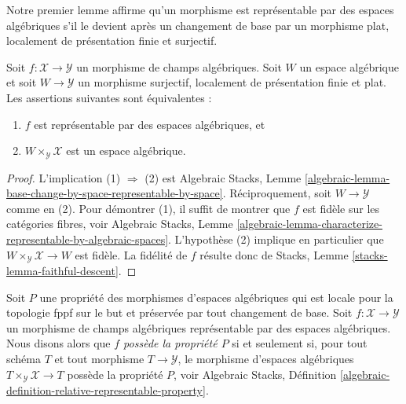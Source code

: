 \medskip\noindent
Notre premier lemme affirme qu'un morphisme est représentable par des espaces algébriques
s'il le devient après un changement de base par un morphisme plat,
localement de présentation finie et surjectif.

\begin{lemma}
\label{lemma-check-representable-covering}
Soit $f : \mathcal{X} \to \mathcal{Y}$ un morphisme de champs algébriques.
Soit $W$ un espace algébrique et soit $W \to \mathcal{Y}$ un morphisme surjectif,
localement de présentation finie et plat. Les assertions suivantes sont équivalentes :
\begin{enumerate}
\item $f$ est représentable par des espaces algébriques, et
\item $W \times_\mathcal{Y} \mathcal{X}$ est un espace algébrique.
\end{enumerate}
\end{lemma}

\begin{proof}
L'implication (1) $\Rightarrow$ (2) est
Algebraic Stacks,
Lemme \ref{algebraic-lemma-base-change-by-space-representable-by-space}.
Réciproquement, soit $W \to \mathcal{Y}$ comme en (2). Pour démontrer (1), il
suffit de montrer que $f$ est fidèle sur les catégories fibres, voir
Algebraic Stacks,
Lemme \ref{algebraic-lemma-characterize-representable-by-algebraic-spaces}.
L'hypothèse (2) implique en particulier que
$W \times_\mathcal{Y} \mathcal{X} \to W$ est fidèle.
La fidélité de $f$ résulte donc de
Stacks, Lemme \ref{stacks-lemma-faithful-descent}.
\end{proof}

\noindent
Soit $P$ une propriété des morphismes d'espaces algébriques qui est
locale pour la topologie fppf sur le but et préservée par tout changement de base.
Soit $f : \mathcal{X} \to \mathcal{Y}$ un morphisme de champs algébriques
représentable par des espaces algébriques. Nous disons alors que
{\it $f$ possède la propriété $P$} si et seulement si, pour tout schéma $T$
et tout morphisme $T \to \mathcal{Y}$, le morphisme d'espaces algébriques
$T \times_\mathcal{Y} \mathcal{X} \to T$ possède la propriété $P$, voir
Algebraic Stacks,
Définition \ref{algebraic-definition-relative-representable-property}.

